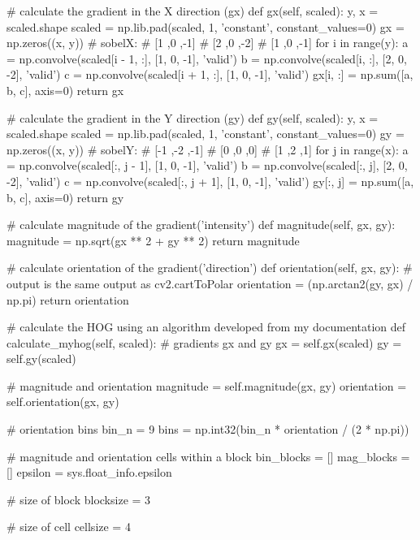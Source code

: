 \begin{pythoncode}
    # calculate the gradient in the X direction (gx)
    def gx(self, scaled):
        y, x = scaled.shape
        scaled = np.lib.pad(scaled, 1, 'constant', constant_values=0)
        gx = np.zeros((x, y))
        # sobelX:
        # [1	,0	,-1]
        # [2	,0	,-2]
        # [1	,0	,-1]
        for i in range(y):
            a = np.convolve(scaled[i - 1, :], [1, 0, -1], 'valid')
            b = np.convolve(scaled[i, :], [2, 0, -2], 'valid')
            c = np.convolve(scaled[i + 1, :], [1, 0, -1], 'valid')
            gx[i, :] = np.sum([a, b, c], axis=0)
        return gx
		
    # calculate the gradient in the Y direction (gy)
    def gy(self, scaled):
        y, x = scaled.shape
        scaled = np.lib.pad(scaled, 1, 'constant', constant_values=0)
        gy = np.zeros((x, y))
        # sobelY:
        # [-1	,-2	,-1]
        # [0	,0	,0]
        # [1	,2	,1]
        for j in range(x):
            a = np.convolve(scaled[:, j - 1], [1, 0, -1], 'valid')
            b = np.convolve(scaled[:, j], [2, 0, -2], 'valid')
            c = np.convolve(scaled[:, j + 1], [1, 0, -1], 'valid')
            gy[:, j] = np.sum([a, b, c], axis=0)
        return gy

    # calculate magnitude of the gradient('intensity')
    def magnitude(self, gx, gy):
        magnitude = np.sqrt(gx ** 2 + gy ** 2)
        return magnitude

    # calculate orientation of the gradient('direction')
    def orientation(self, gx, gy):
        # output is the same output as cv2.cartToPolar
        orientation = (np.arctan2(gy, gx) / np.pi) %
        return orientation
	
    # calculate the HOG using an algorithm developed from my documentation
    def calculate_myhog(self, scaled):
        # gradients gx and gy
        gx = self.gx(scaled)
        gy = self.gy(scaled)

        # magnitude and orientation
        magnitude = self.magnitude(gx, gy)
        orientation = self.orientation(gx, gy)

        # orientation bins
        bin_n = 9
        bins = np.int32(bin_n * orientation / (2 * np.pi))

        # magnitude and orientation cells within a block
        bin_blocks = []
        mag_blocks = []
        epsilon = sys.float_info.epsilon

        # size of block
        blocksize = 3 
		
        # size of cell
        cellsize = 4


\end{pythoncode}
